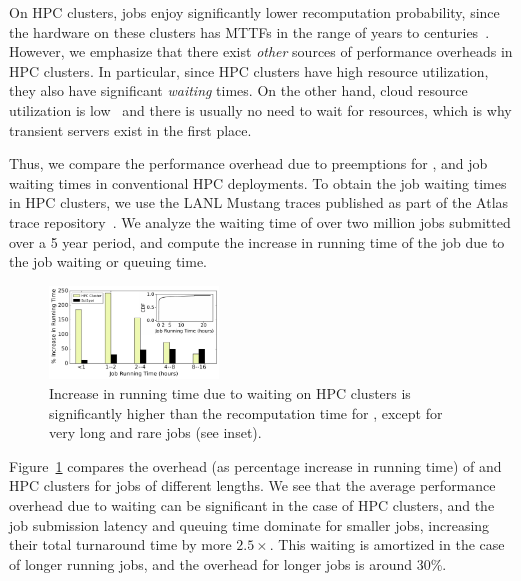 On HPC clusters, jobs enjoy significantly lower recomputation probability, since the hardware on these clusters has MTTFs in the range of years to centuries~\cite{dongarra_fault_nodate}.
However, we emphasize that there exist \emph{other} sources of performance overheads in HPC clusters.
In particular, since HPC clusters have high resource utilization, they also have significant \emph{waiting} times. 
On the other hand, cloud resource utilization is low~\cite{borg} and there is usually no need to wait for resources, which is why transient servers exist in the first place. 


Thus, we compare the performance overhead due to preemptions for \sysname, and job waiting times in conventional HPC deployments.
To obtain the job waiting times in HPC clusters, we use the LANL Mustang traces published as part of the Atlas trace repository~\cite{cmu-atlas}.
We analyze the waiting time of over two million jobs submitted over a 5 year period, and compute the increase in running time of the job due to the job waiting or queuing time. 

\begin{figure}[t]
  \centering 
  \includegraphics[width=0.4\textwidth]{../graphs/hpc-vs-scispot.pdf}
      \vspace*{\myfigspace}
  \caption{Increase in running time due to waiting on HPC clusters is significantly higher than the recomputation time for \sysname, except for very long and rare jobs (see inset). }
  \label{fig:hpc-vs-scispot}
  \vspace*{\myfigspace}
\end{figure}


Figure~\ref{fig:hpc-vs-scispot} compares the overhead (as percentage increase in running time) of \sysname and HPC clusters  for jobs of different lengths. We see that the average performance overhead due to waiting can be significant in the case of HPC clusters, and the job submission latency and queuing time dominate for smaller jobs, increasing their total turnaround time by more $2.5\times$.
This waiting is amortized in the case of longer running jobs, and the overhead for longer jobs is around 30\%.

